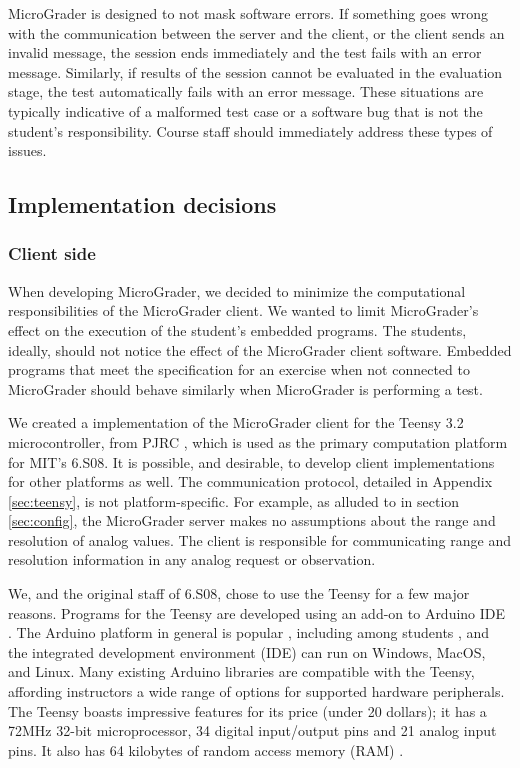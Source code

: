 \documentclass[12pt]{article}
\begin{document}
MicroGrader is designed to not mask software errors.  If something goes wrong with the communication between the server and the client, or the client sends an invalid message, the session ends immediately and the test fails with an error message.  Similarly, if results of the session cannot be evaluated in the evaluation stage, the test automatically fails with an error message.  These situations are typically indicative of a malformed test case or a software bug that is not the student's responsibility.  Course staff should immediately address these types of issues.


\subsection{Implementation decisions}
\subsubsection{Client side}
When developing MicroGrader, we decided to minimize the computational responsibilities of the MicroGrader client.  We wanted to limit MicroGrader's effect on the execution of the student's embedded programs.  The students, ideally, should not notice the effect of the MicroGrader client software.  Embedded programs that meet the specification for an exercise when not connected to MicroGrader should behave similarly when MicroGrader is performing a test.

We created a implementation of the MicroGrader client for the Teensy 3.2 microcontroller, from PJRC \cite{teensy}, which is used as the primary computation platform for MIT's 6.S08.  It is possible, and desirable, to develop client implementations for other platforms as well.  The communication protocol, detailed in Appendix \ref{sec:teensy}, is not platform-specific.  For example, as alluded to in section \ref{sec:config}, the MicroGrader server makes no assumptions about the range and resolution of analog values.  The client is responsible for communicating range and resolution information in any analog request or observation.

We, and the original staff of 6.S08, chose to use the Teensy for a few major reasons.  Programs for the Teensy are developed using an add-on to Arduino IDE \cite{arduino-ide}.  The Arduino platform in general is popular \cite{arduino-popular}, including among students \cite{arduino-students}, and the integrated development environment (IDE) can run on Windows, MacOS, and Linux.  Many existing Arduino libraries are compatible with the Teensy, affording instructors a wide range of options for supported hardware peripherals.  The Teensy boasts impressive features for its price (under 20 dollars); it has a 72MHz 32-bit microprocessor, 34 digital input/output pins and 21 analog input pins.  It also has 64 kilobytes of random access memory (RAM) \cite{teensy-specs}.
\end{document}
